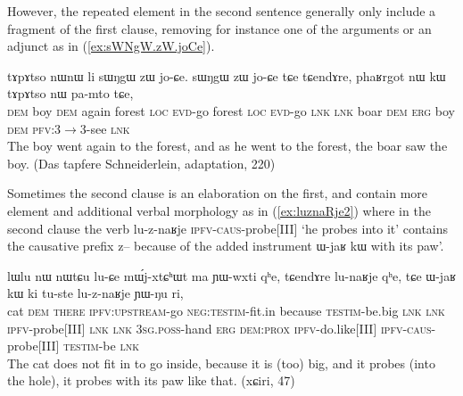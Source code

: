 \documentclass[oldfontcommands,oneside,a4paper,11pt]{article}
\newcommand{\ipa}[1]{{\phon \mbox{#1}}} %
\newcommand{\refb}[1]{(\ref{#1})}
\begin{document}
However, the repeated element in the second sentence generally only include a fragment of the first clause, removing for instance one of the arguments or an adjunct as in \refb{ex:sWNgW.zW.joCe}.

 \begin{exe}
\ex \label{ex:sWNgW.zW.joCe}
\gll 	\ipa{nɯ} 	\ipa{tɤpɤtso} 	\ipa{nɯnɯ} 	\ipa{li} 	\ipa{sɯŋgɯ} 	\ipa{zɯ} 	\ipa{jo-ɕe.} 	\ipa{sɯŋgɯ} 	\ipa{zɯ} 	\ipa{jo-ɕe} 	\ipa{tɕe} 	\ipa{tɕendɤre,} 	\ipa{phaʁrgot} 	\ipa{nɯ} 	\ipa{kɯ} 	\ipa{tɤpɤtso} 	\ipa{nɯ} 	\ipa{pa-mto} 	\ipa{tɕe,} 	\\
  \textsc{dem} boy \textsc{dem} again forest \textsc{loc} \textsc{evd}-go  forest \textsc{loc} \textsc{evd}-go \textsc{lnk} \textsc{lnk} boar \textsc{dem} \textsc{erg} boy \textsc{dem} \textsc{pfv}:3$\rightarrow$3-see \textsc{lnk}   \\
\glt The boy went again to the forest, and as he went to the forest, the boar saw the boy. (Das tapfere Schneiderlein, adaptation, 220)
\end{exe}


 

Sometimes the second clause is an elaboration on the first, and contain more element and additional verbal morphology as in \refb{ex:luznaRje2} where in the second clause the verb \ipa{lu-z-naʁje} \textsc{ipfv-caus}-probe[III] `he probes into it' contains the causative prefix \ipa{z--} because of the added instrument \ipa{ɯ-jaʁ} 	\ipa{kɯ}  with its paw'.
\begin{exe}
\ex \label{ex:luznaRje2}
\gll
\ipa{lɯlu} 	\ipa{nɯ} 	\ipa{nɯtɕu} 	\ipa{lu-ɕe} 	\ipa{mɯ́j-xtɕʰɯt} 	\ipa{ma} 	\ipa{ɲɯ-wxti} 	\ipa{qʰe,} 	\ipa{tɕendɤre} 	\ipa{lu-naʁje} 	\ipa{qʰe,}  \ipa{tɕe} 	\ipa{ɯ-jaʁ} 	\ipa{kɯ} 	\ipa{ki} 	\ipa{tu-ste} 	\ipa{lu-z-naʁje} 	\ipa{ɲɯ-ŋu} 	\ipa{ri,} \\
cat \textsc{dem} \textsc{there} \textsc{ipfv:upstream}-go  \textsc{neg:testim}-fit.in because \textsc{testim}-be.big \textsc{lnk}  \textsc{lnk} \textsc{ipfv}-probe[III] \textsc{lnk} \textsc{lnk} \textsc{3sg.poss}-hand \textsc{erg} \textsc{dem:prox} \textsc{ipfv}-do.like[III] \textsc{ipfv-caus}-probe[III] \textsc{testim}-be \textsc{lnk} \\
\glt The cat does not fit in to go inside, because it is (too) big, and it probes (into the hole), it probes with its paw like that. (xɕiri, 47)
\end{exe}
\end{document}
